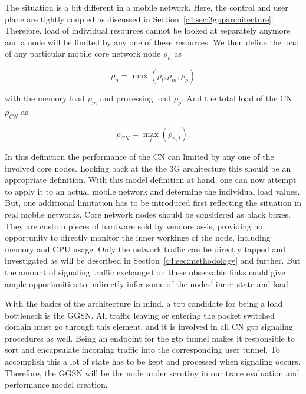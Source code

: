 The situation is a bit different in a mobile network. Here, the control and user plane are tightly coupled as discussed in Section~\ref{c4:sec:3gpparchitecture}.  Therefore, load of individual resources cannot be looked at separately anymore and a node will be limited by any one of these resources. We then define the load of any particular mobile core network node $\rho_{n}$ as

\begin{equation}
\rho_{n} = \max(\rho_{l}, \rho_{m}, \rho_{p})
\end{equation}

with the memory load $\rho_{m}$ and processing load $\rho_{p}$. And the total load of the \gls{CN} $\rho_{CN}$ as

\begin{equation}
\rho_{CN} = \max_{i}(\rho_{n,i})\text{.}
\end{equation}

In this definition the performance of the \gls{CN} can limited by any one of the involved core nodes. Looking back at the the \gls{3G} architecture this should be an appropriate definition. With this model definition at hand, one can now attempt to apply it to an actual mobile network and determine the individual load values. But, one additional limitation has to be introduced first reflecting the situation in real mobile networks. Core network nodes should be considered as black boxes. They are custom pieces of hardware sold by vendors as-is, providing no opportunity to directly monitor the inner workings of the node, including memory and CPU usage. Only the network traffic can be directly tapped and investigated as will be described in Section~\ref{c4:sec:methodology} and further. But the amount of signaling traffic exchanged on these observable links could give ample opportunities to indirectly infer some of the nodes' inner state and load.

With the basics of the architecture in mind, a top candidate for being a load bottleneck is the \gls{GGSN}. All traffic leaving or entering the packet switched domain must go through this element, and it is involved in all \gls{CN} \gls{gtp} signaling procedures as well. Being an endpoint for the \gls{gtp} tunnel makes it responsible to sort and encapsulate incoming traffic into the corresponding user tunnel. To accomplish this a lot of state has to be kept and processed when signaling occurs. Therefore, the \gls{GGSN} will be the node under scrutiny in our trace evaluation and performance model creation.

